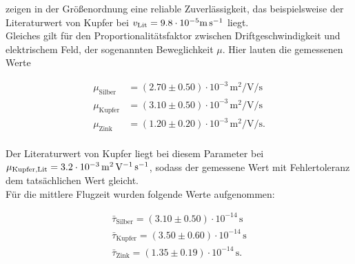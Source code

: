 \noindent zeigen in der Größenordnung eine reliable Zuverlässigkeit, das beispielsweise der Literaturwert von Kupfer bei 
$v_\text{Lit} = 9.8\cdot{}10^{-5}\unit[per-mode=reciprocal]{\meter\per\second}$ liegt.\\

\noindent Gleiches gilt für den Proportionalitätsfaktor zwischen Driftgeschwindigkeit und elektrischem Feld, der 
sogenannten Beweglichkeit $\mu$. Hier lauten die gemessenen Werte 

\begin{align*}
    \mu_\text{Silber} &= \left(2.70 \pm0.50\right)\cdot{}10^{-3}\,\unit{\square\meter\per\volt\per\second}\\
    \mu_\text{Kupfer} &= \left(3.10 \pm0.50\right)\cdot{}10^{-3}\,\unit{\square\meter\per\volt\per\second}\\
    \mu_\text{Zink  } &= \left(1.20\pm 0.20\right)\cdot{}10^{-3}\,\unit{\square\meter\per\volt\per\second}.\\
\end{align*}

\noindent Der Literaturwert von Kupfer \cite[292]{Physikalisches_Praktikum} liegt bei diesem Parameter bei $\mu_\text{Kupfer,Lit} = 3.2
\cdot{}10^{-3}\,\unit[per-mode=reciprocal]{\square\meter\per\volt\per\second}$, sodass der gemessene Wert mit Fehlertoleranz dem tatsächlichen 
Wert gleicht.\\

\noindent Für die mittlere Flugzeit wurden folgende Werte aufgenommen:

\begin{align*}
    \bar{\tau}_\text{Silber} = \left(3.10\pm0.50\right)\cdot10^{-14}\,\unit{\second}\\
    \bar{\tau}_\text{Kupfer} = \left(3.50\pm0.60\right)\cdot10^{-14}\,\unit{\second}\\
    \bar{\tau}_\text{Zink} =   \left(1.35\pm0.19\right)\cdot10^{-14}\,\unit{\second}.\\
\end{align*}

